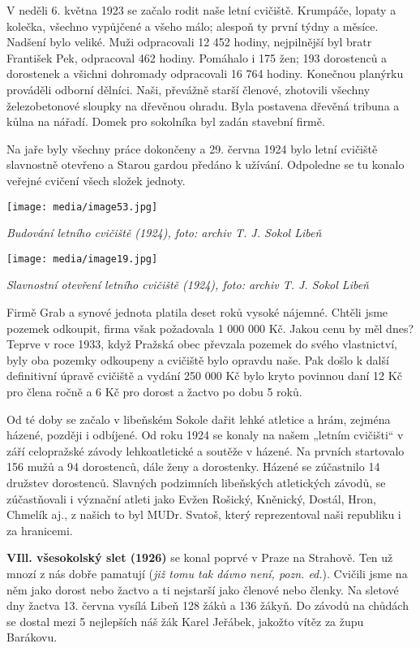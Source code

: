V neděli 6. května 1923 se začalo rodit naše letní cvičiště. Krumpáče,
lopaty a kolečka, všechno vypůjčené a všeho málo; alespoň ty první týdny
a měsíce. Nadšení bylo veliké. Muži odpracovali 12 452 hodiny,
nejpilnější byl bratr František Pek, odpracoval 462 hodiny. Pomáhalo i
175 žen; 193 dorostenců a dorostenek a všichni dohromady odpracovali 16
764 hodiny. Konečnou planýrku prováděli odborní dělníci. Naši, převážně
starší členové, zhotovili všechny železobetonové sloupky na dřevěnou
ohradu. Byla postavena dřevěná tribuna a kůlna na nářadí. Domek pro
sokolníka byl zadán stavební firmě.

Na jaře byly všechny práce dokončeny a 29. června 1924 bylo letní
cvičiště slavnostně otevřeno a Starou gardou předáno k užívání.
Odpoledne se tu konalo veřejné cvičení všech složek jednoty.

\texttt{[image: media/image53.jpg]}

\emph{Budování letního cvičiště (1924), foto: archiv T. J. Sokol Libeň}

\texttt{[image: media/image19.jpg]}

\emph{Slavnostní otevření letního cvičiště (1924), foto: archiv T. J.
Sokol Libeň}

Firmě Grab a synové jednota platila deset roků vysoké nájemné. Chtěli
jsme pozemek odkoupit, firma však požadovala 1 000 000 Kč. Jakou cenu by
měl dnes? Teprve v roce 1933, když Pražská obec převzala pozemek do
svého vlastnictví, byly oba pozemky odkoupeny a cvičiště bylo opravdu
naše. Pak došlo k další definitivní úpravě cvičiště a vydání 250 000 Kč
bylo kryto povinnou daní 12 Kč pro člena ročně a 6 Kč pro dorost a
žactvo po dobu 5 roků.

Od té doby se začalo v libeňském Sokole dařit lehké atletice a hrám,
zejména házené, později i odbíjené. Od roku 1924 se konaly na našem
„letním cvičišti`` v září celopražské závody lehkoatletické a soutěže v
házené. Na prvních startovalo 156 mužů a 94 dorostenců, dále ženy a
dorostenky. Házené se zúčastnilo 14 družstev dorostenců. Slavných
podzimních libeňských atletických závodů, se zúčastňovali i význační
atleti jako Evžen Rošický, Kněnický, Dostál, Hron, Chmelík aj., z našich
to byl MUDr. Svatoš, který reprezentoval naši republiku i za hranicemi.

\textbf{VIll. všesokolský slet (1926)} se konal poprvé v Praze na
Strahově. Ten už mnozí z nás dobře pamatují (\emph{již tomu tak dávno
není, pozn. ed.}). Cvičili jsme na něm jako dorost nebo žactvo a ti
nejstarší jako členové nebo členky. Na sletové dny žactva 13. června
vysílá Libeň 128 žáků a 136 žákyň. Do závodů na chůdách se dostal mezi 5
nejlepších náš žák Karel Jeřábek, jakožto vítěz za župu Barákovu.

